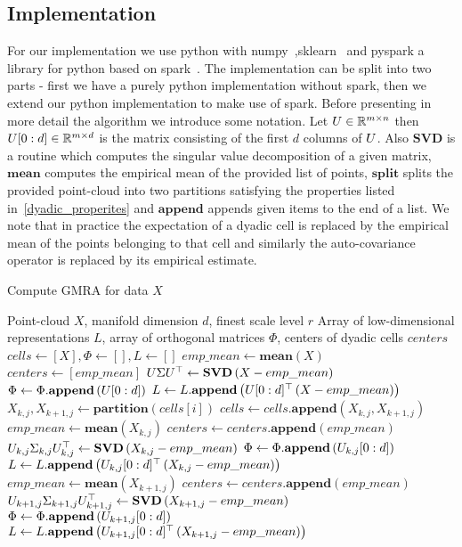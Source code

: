 \documentclass{article}
\begin{document}
	\subsection{Implementation}
	For our implementation we use python with numpy~\cite{van2011numpy},sklearn~\cite{pedregosa2011scikit} and pyspark a library for python based on spark~\cite{zaharia2010spark}. The implementation can be split into two parts - first we have a purely python implementation without spark, then we extend our python implementation to make use of spark. Before presenting in more detail the algorithm we introduce some notation. Let ${U} \in \mathbb{R}^{m\times n}$ then ${U}[0:d] \in \mathbb{R}^{m\times d}$ is the matrix consisting of the first $d$ columns of ${U}$. Also $\mathbf{SVD}$ is a routine which computes the singular value decomposition of a given matrix, $\mathbf{mean}$ computes the empirical mean of the provided list of points, $\mathbf{split}$ splits the provided point-cloud into two partitions satisfying the properties listed in~\ref{dyadic_properites} and $\mathbf{append}$ appends given items to the end of a list. We note that in practice the expectation of a dyadic cell is replaced by the empirical mean of the points belonging to that cell and similarly the auto-covariance operator is replaced by its empirical estimate.\\
	\begin{algorithm}[t]
		\caption{Compute GMRA for data $X$}
		\label{gmra_pseudo}
		\begin{algorithmic}
			\REQUIRE Point-cloud $X$, manifold dimension $d$, finest scale level $r$
			\ENSURE Array of low-dimensional representations $L$, array of orthogonal matrices $\Phi$, centers of dyadic cells $centers$
			\STATE $cells \leftarrow [X],\Phi \leftarrow [], L \leftarrow []$
			\STATE $emp\_mean \leftarrow \mathbf{mean}\left(X\right)$
			\STATE $centers \leftarrow [emp\_mean]$
			\STATE ${U}\Sigma{U}^{\top} \leftarrow \mathbf{SVD}\left(X-emp\_mean\right)$
			\STATE $\Phi \leftarrow \Phi.\mathbf{append}\left({U}[0:d]\right)$
			\STATE $L \leftarrow L.\mathbf{append}\left({U}[0:d]^{\top}\left(X-emp\_mean\right)\right)$
			\STATE $X_{k,j},X_{k+1,j} \leftarrow \mathbf{partition}\left(cells[i]\right)$
			\STATE $cells \leftarrow cells.\mathbf{append}\left(X_{k,j},X_{k+1,j}\right)$
			\STATE $emp\_mean \leftarrow \mathbf{mean}\left(X_{k,j}\right)$
			\STATE $centers \leftarrow centers.\mathbf{append}\left(emp\_mean\right)$
			\STATE ${U}_{k,j}\Sigma_{k,j}{U}_{k,j}^{\top} \leftarrow \mathbf{SVD}\left(X_{k,j}-emp\_mean\right)$
			\STATE $\Phi \leftarrow \Phi.\mathbf{append}\left({U}_{k,j}[0:d]\right)$
			\STATE $L \leftarrow L.\mathbf{append}\left({U}_{k,j}[0:d]^{\top}\left(X_{k,j}-emp\_mean\right)\right)$
			\STATE $emp\_mean \leftarrow \mathbf{mean}\left(X_{k+1,j}\right)$
			\STATE $centers \leftarrow centers.\mathbf{append}\left(emp\_mean\right)$
			\STATE ${U}_{k+1,j}\Sigma_{k+1,j}{U}_{k+1,j}^{\top} \leftarrow \mathbf{SVD}\left(X_{k+1,j}-emp\_mean\right)$
			\STATE $\Phi \leftarrow \Phi.\mathbf{append}\left({U}_{k+1,j}[0:d]\right)$
			\STATE $L \leftarrow L.\mathbf{append}\left({U}_{k+1,j}[0:d]^{\top}\left(X_{k+1,j}-emp\_mean\right)\right)$
			\ENDFOR
		\end{algorithmic}
	\end{algorithm}
\end{document}

